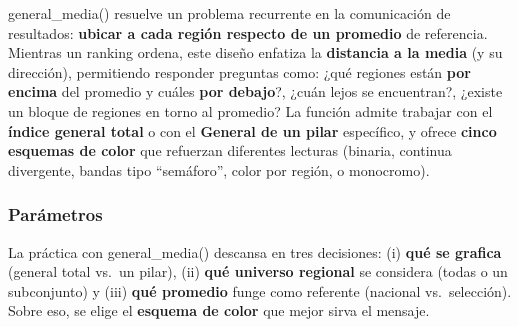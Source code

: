 \documentclass[
  11pt,
  letterpaper,
  DIV=11,
  numbers=noendperiod]{scrartcl}
\begin{document}
general\_media() resuelve un problema recurrente en la comunicación de
resultados: \textbf{ubicar a cada región respecto de un promedio} de
referencia. Mientras un ranking ordena, este diseño enfatiza la
\textbf{distancia a la media} (y su dirección), permitiendo responder
preguntas como: ¿qué regiones están \textbf{por encima} del promedio y
cuáles \textbf{por debajo}?, ¿cuán lejos se encuentran?, ¿existe un
bloque de regiones en torno al promedio? La función admite trabajar con
el \textbf{índice general total} o con el \textbf{General de un pilar}
específico, y ofrece \textbf{cinco esquemas de color} que refuerzan
diferentes lecturas (binaria, continua divergente, bandas tipo
``semáforo'', color por región, o monocromo).

\subsubsection{\texorpdfstring{\textbf{Parámetros}}{Parámetros}}\label{paruxe1metros-7}

La práctica con general\_media() descansa en tres decisiones: (i)
\textbf{qué se grafica} (general total vs.~un pilar), (ii) \textbf{qué
universo regional} se considera (todas o un subconjunto) y (iii)
\textbf{qué promedio} funge como referente (nacional vs.~selección).
Sobre eso, se elige el \textbf{esquema de color} que mejor sirva el
mensaje.
\end{document}
